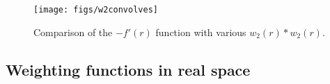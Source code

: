 \documentclass[letterpaper,twocolumn,amsmath,amssymb,prb]{revtex4-1}
\newcommand{\red}[1]{{\bf \color{red} #1}}
\newcommand{\fixme}[1]{\red{[#1]}}
\begin{document}
\begin{figure}
\begin{center}
\texttt{[image: figs/w2convolves]}
\end{center}
\caption{Comparison of the $-f'(r)$ function with various $w_2(r)\ast
  w_2(r)$.}
\label{fig:w2convolves}
\end{figure}


\subsection{Weighting functions in real space}
\end{document}
